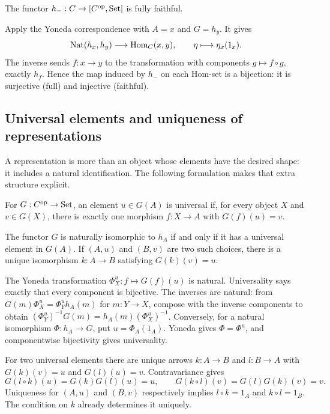 \begin{lemma}
The functor $h_-:C\to[C^{\textrm{op}},{\textrm{Set}}]$ is fully faithful.
\end{lemma}
\Proof
Apply the Yoneda correspondence with $A=x$ and $G=h_y$. It gives
\[
{\textrm{Nat}}(h_x,h_y)\longrightarrow{\textrm{Hom}}_C(x,y),\qquad
\eta\longmapsto\eta_x(1_x).
\]
The inverse sends $f:x\to y$ to the transformation with components
$g\mapsto f\circ g$, exactly $h_f$. Hence the map induced by $h_-$
on each Hom-set is a bijection: it is surjective (full) and injective
(faithful).
\Done

\subsection{Universal elements and uniqueness of representations}
A representation is more than an object whose elements have the desired
shape: it includes a natural identification. The following formulation
makes that extra structure explicit.

\begin{definition}
For $G:C^{\textrm{op}}\to{\textrm{Set}}$, an element $u\in G(A)$ is universal if, for every
object $X$ and $v\in G(X)$, there is exactly one morphism $f:X\to A$
with $G(f)(u)=v$.
\end{definition}

\begin{proposition}
The functor $G$ is naturally isomorphic to $h_A$ if and only if it has a
universal element in $G(A)$. If $(A,u)$ and $(B,v)$ are two such choices,
there is a unique isomorphism $k:A\to B$ satisfying $G(k)(v)=u$.
\end{proposition}
\Proof
The Yoneda transformation $\Phi^u_X:f\mapsto G(f)(u)$ is natural.
Universality says exactly that every component is bijective. The inverses
are natural: from
$G(m)\Phi^u_X=\Phi^u_Yh_A(m)$ for $m:Y\to X$, compose with the inverse
components to obtain
$(\Phi^u_Y)^{-1}G(m)=h_A(m)(\Phi^u_X)^{-1}$.
Conversely, for a natural isomorphism $\Phi:h_A\to G$, put
$u=\Phi_A(1_A)$. Yoneda gives $\Phi=\Phi^u$, and componentwise bijectivity
gives universality.

For two universal elements there are unique arrows $k:A\to B$ and
$l:B\to A$ with $G(k)(v)=u$ and $G(l)(u)=v$. Contravariance gives
\[
G(l\circ k)(u)=G(k)G(l)(u)=u,
\qquad
G(k\circ l)(v)=G(l)G(k)(v)=v.
\]
Uniqueness for $(A,u)$ and $(B,v)$ respectively implies
$l\circ k=1_A$ and $k\circ l=1_B$. The condition on $k$ already determines
it uniquely.
\Done

